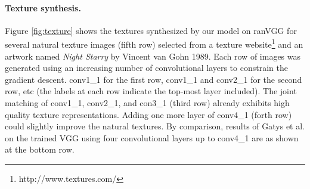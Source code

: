 \documentclass{article}
\begin{document}
%


\paragraph{Texture synthesis.}
Figure \ref{fig:texture} shows the textures synthesized by our model on ranVGG
for several natural texture images (fifth row) selected from a texture website\footnote{http://www.textures.com/} and an artwork named \emph{Night Starry} by Vincent van Gohn 1989.
Each row of images was generated using an increasing number of convolutional layers to constrain the gradient descent.
conv1\_1 for the first row, conv1\_1 and conv2\_1 for the second row, etc (the labels at each row indicate the top-most layer included).
The joint matching of conv1\_1, conv2\_1, and con3\_1 (third row) already exhibits high quality texture representations.
Adding one more layer of conv4\_1 (forth row) could slightly improve the natural textures.
By comparison, results of Gatys et al.\cite{Gatys2015texture} on the trained VGG using four convolutional layers up to conv4\_1 are as shown at the bottom row.
\end{document}
